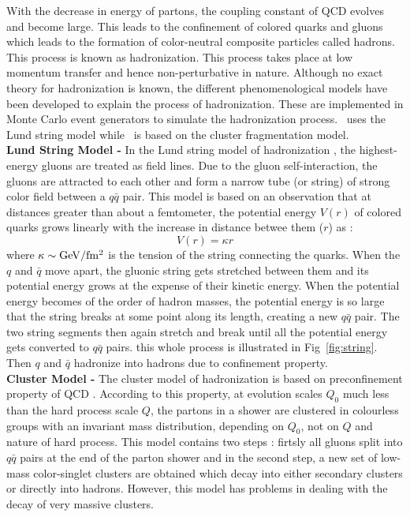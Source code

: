 With the decrease in energy of partons, the coupling constant of QCD \alps evolves and become large. This leads to the confinement of colored quarks and gluons which leads to the formation of color-neutral composite particles called hadrons. This process is known as hadronization. This process takes place at low momentum transfer and hence non-perturbative in nature. Although no exact theory for hadronization is known, the different phenomenological models have been developed to explain the process of hadronization. These are implemented in Monte Carlo event generators to simulate the hadronization process. \PYTHIA~uses the Lund string model while \HERWIG~is based on the cluster fragmentation model. \\\newline
{\bf Lund String Model -} In the Lund string model of hadronization \cite{Andersson:1998tv}, the highest-energy gluons are treated as field lines. Due to the gluon self-interaction, the gluons are attracted to each other and form a narrow tube (or string) of strong color field between a $q\bar{q}$ pair. This model is based on an observation that at distances greater than about a femtometer, the potential energy $V(r)$ of colored quarks grows linearly with the increase in distance betwee them ($r$) as :
\begin{equation}
V(r) = \kappa r
\end{equation}
where $\kappa \sim {\rm GeV/fm^2}$ is the tension of the string connecting the quarks. When the $q$ and $\bar{q}$ move apart, the gluonic string gets stretched between them and its potential energy grows at the expense of their kinetic energy. When the potential energy becomes of the order of hadron masses, the potential energy is so large that the string breaks at some point along its length, creating a new $q\bar{q}$ pair. The two string segments then again stretch and break until all the potential energy gets converted to $q\bar{q}$ pairs. this whole process is illustrated in Fig~\ref{fig:string}. Then $q$ and $\bar{q}$ hadronize into hadrons due to confinement property. \\ \newline
{\bf Cluster Model -} The cluster model of hadronization \cite{Marchesini:1987cf,Webber:1983if} is based on preconfinement property of QCD \cite{Amati:1979fg}. According to this property, at evolution scales $Q_0$ much less than the hard process scale $Q$, the partons in a shower are clustered in colourless groups with an invariant mass distribution, depending on $Q_0$, not on $Q$ and nature of hard process. This model contains two steps : firtsly all gluons split into $q\bar{q}$ pairs at the end of the parton shower and in the second step, a new set of low-mass color-singlet clusters are obtained which decay into either secondary clusters or directly into hadrons. However, this model has problems in dealing with the decay of very massive clusters.

